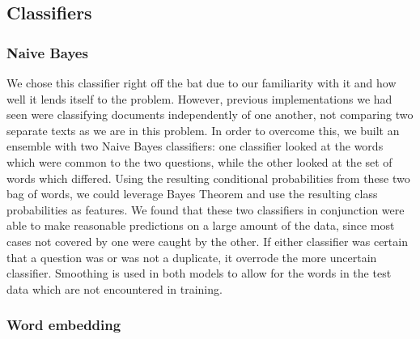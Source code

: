 \documentclass{article}
\begin{document}
\subsection{Classifiers}

\subsubsection{Naive Bayes}

We chose this classifier right off the bat due to our familiarity with it and
how well it lends itself to the problem. However, previous implementations we
had seen were classifying documents independently of one another, not comparing
two separate texts as we are in this problem. In order to overcome this, we
built an ensemble with two Naive Bayes classifiers: one classifier looked at the
words which were common to the two questions, while the other looked at the set
of words which differed. Using the resulting conditional probabilities from
these two bag of words, we could leverage Bayes Theorem and use the resulting
class probabilities as features. We found that these two classifiers in
conjunction were able to make reasonable predictions on a large amount of the
data, since most cases not covered by one were caught by the other. If either
classifier was certain that a question was or was not a duplicate, it overrode
the more uncertain classifier. Smoothing is used in both models to allow for the
words in the test data which are not encountered in training.

\subsubsection{Word embedding}
\end{document}
